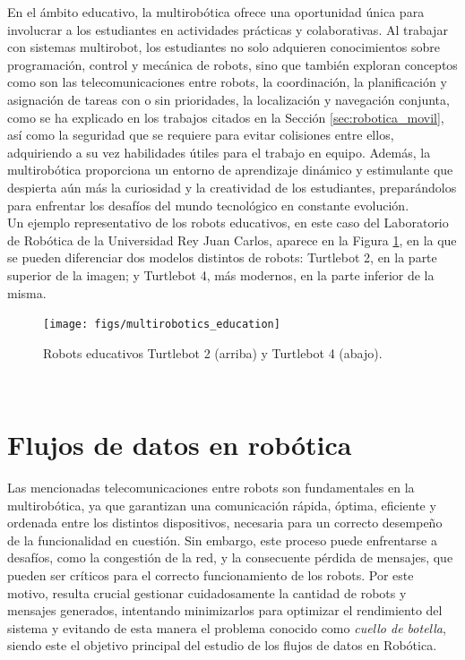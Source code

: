 En el ámbito educativo, la multirobótica ofrece una oportunidad única para
involucrar a los estudiantes en actividades prácticas y colaborativas.
Al trabajar con sistemas multirobot, los estudiantes no solo adquieren
conocimientos sobre programación, control y mecánica de robots, sino que también
exploran conceptos como son las telecomunicaciones entre robots, la coordinación,
la planificación y asignación de tareas con o sin prioridades, la localización y
navegación conjunta, como se ha explicado en los trabajos citados en la Sección
\ref{sec:robotica_movil}, así como la seguridad que se requiere para evitar
colisiones entre ellos, adquiriendo a su vez habilidades útiles para el trabajo
en equipo.
Además, la multirobótica proporciona un entorno de aprendizaje dinámico y
estimulante que despierta aún más la curiosidad y la creatividad de los
estudiantes, preparándolos para enfrentar los desafíos del mundo tecnológico en
constante evolución.
\\

Un ejemplo representativo de los robots educativos, en este caso del Laboratorio
de Robótica de la Universidad Rey Juan Carlos, aparece en la Figura
\ref{fig:robots_education}, en la que se pueden diferenciar dos modelos
distintos de robots: Turtlebot 2, en la parte superior de la imagen; y Turtlebot
4, más modernos, en la parte inferior de la misma.

\begin{figure} [h!]
  \begin{center}
    \texttt{[image: figs/multirobotics\_education]}
  \end{center}
  \caption{Robots educativos Turtlebot 2 (arriba) y Turtlebot 4 (abajo).}
  \label{fig:robots_education}
\end{figure}\



\section{Flujos de datos en robótica}
\label{sec:flujos_datos} %

Las mencionadas telecomunicaciones entre robots son fundamentales en la
multirobótica, ya que garantizan una comunicación rápida, óptima, eficiente y
ordenada entre los distintos dispositivos, necesaria para un correcto desempeño
de la funcionalidad en cuestión.
Sin embargo, este proceso puede enfrentarse a desafíos, como la congestión de la
red, y la consecuente pérdida de mensajes, que pueden ser críticos para el
correcto funcionamiento de los robots.
Por este motivo, resulta crucial gestionar cuidadosamente la cantidad de robots
y mensajes generados, intentando minimizarlos para optimizar el rendimiento del
sistema y evitando de esta manera el problema conocido como \textit{cuello de
botella}, siendo este el objetivo principal del estudio de los flujos de datos
en Robótica.
\\

